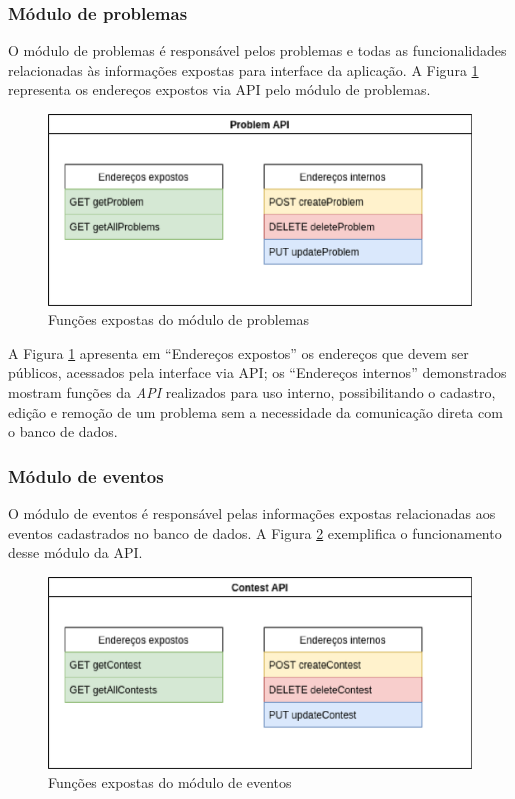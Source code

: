 \subsubsection{Módulo de problemas}
\label{subsubsec:moduloDeProblemas}

O módulo de problemas é responsável pelos problemas e todas as funcionalidades relacionadas às informações expostas para interface da aplicação. A Figura \ref{fig:problems_endpoints} representa os endereços expostos via API pelo módulo de problemas.

\begin{figure}[H]
    \centering
    \includegraphics[keepaspectratio=true,scale=0.5]{figuras/problems_endpoins.eps}
    \caption{Funções expostas do módulo de problemas}
    \label{fig:problems_endpoints}
\end{figure}

A Figura \ref{fig:problems_endpoints} apresenta em ``Endereços expostos'' os endereços que devem ser públicos, acessados pela interface via API; os ``Endereços internos'' demonstrados mostram funções da \textit{API} realizados para uso interno, possibilitando o cadastro, edição e remoção de um problema sem a necessidade da comunicação direta com o banco de dados.

\subsubsection{Módulo de eventos}
\label{subsec:moduloDeEventos}

O módulo de eventos é responsável pelas informações expostas relacionadas aos eventos cadastrados no banco de dados. A Figura \ref{fig:contests_endpoint} exemplifica o funcionamento desse módulo da API.

\begin{figure}[H]
    \centering
    \includegraphics[keepaspectratio=true,scale=0.5]{figuras/contests_endpoint.eps}
    \caption{Funções expostas do módulo de eventos}
    \label{fig:contests_endpoint}
\end{figure}

